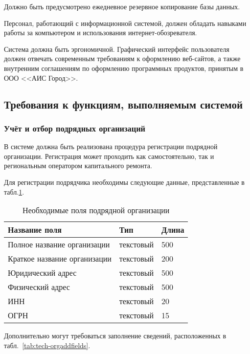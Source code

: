 Должно быть предусмотрено ежедневное резервное копирование базы данных.

Персонал, работающий с информационной системой, должен обладать навыками работы за компьютером и использования интернет-обозревателя.

Система должна быть эргономичной.
Графический интерфейс пользователя должен отвечать современным требованиям к оформлению веб-сайтов, а также внутренним соглашениям по оформлению программных продуктов, принятым в ООО <<АИС Город>>.

\subsection{Требования к функциям, выполняемым системой}

\subsubsection{Учёт и отбор подрядных организаций}

В системе должна быть реализована процедура регистрации подрядной организации.
Регистрация может проходить как самостоятельно, так и региональным оператором капитального ремонта.

Для регистрации подрядчика необходимы следующие данные, представленные в табл.\ref{tab:tech-orgfields}.

\begin{footnotesize}
\begin{longtable}[h]{|p{}|p{}|p{}|}
	\caption{\label{tab:tech-orgfields}Необходимые поля подрядной организации} \\
	\hline
		\textbf{Название поля} & \textbf{Тип} & \textbf{Длина} \\
	\hline \endhead
		Полное название организации & текстовый & 500 \\
	\hline
		Краткое название организации & текстовый & 200 \\
	\hline
		Юридический адрес & текстовый & 500 \\
	\hline
		Физический адрес & текстовый & 500 \\
	\hline
		ИНН & текстовый & 20 \\
	\hline
		ОГРН & текстовый & 15 \\
	\hline
\end{longtable}
\end{footnotesize}

Дополнительно могут требоваться заполнение сведений, расположенных в табл.~\ref{tab:tech-orgaddfields}.

